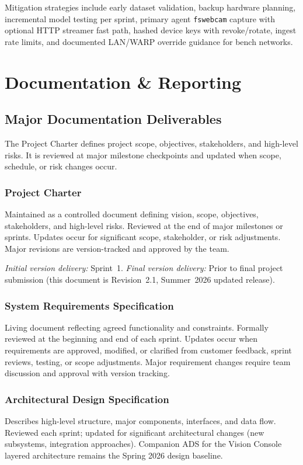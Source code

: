 \documentclass[11pt,letterpaper]{article}
\begin{document}
Mitigation strategies include early dataset validation, backup hardware planning, incremental model
testing per sprint, primary agent \texttt{fswebcam} capture with optional HTTP streamer fast path, hashed device keys with
revoke/rotate, ingest rate limits, and documented LAN/WARP override guidance for bench networks.

\section{Documentation \& Reporting}
\subsection{Major Documentation Deliverables}
The Project Charter defines project scope, objectives, stakeholders, and high-level risks. It is reviewed
at major milestone checkpoints and updated when scope, schedule, or risk changes occur.

\subsubsection{Project Charter}
Maintained as a controlled document defining vision, scope, objectives, stakeholders, and high-level
risks. Reviewed at the end of major milestones or sprints. Updates occur for significant scope,
stakeholder, or risk adjustments. Major revisions are version-tracked and approved by the team.

\textit{Initial version delivery:} Sprint~1.
\textit{Final version delivery:} Prior to final project submission (this document is Revision~2.1,
Summer~2026 updated release).

\subsubsection{System Requirements Specification}
Living document reflecting agreed functionality and constraints. Formally reviewed at the beginning
and end of each sprint. Updates occur when requirements are approved, modified, or clarified from
customer feedback, sprint reviews, testing, or scope adjustments. Major requirement changes require
team discussion and approval with version tracking.

\subsubsection{Architectural Design Specification}
Describes high-level structure, major components, interfaces, and data flow. Reviewed each sprint;
updated for significant architectural changes (new subsystems, integration approaches). Companion
ADS for the Vision Console layered architecture remains the Spring 2026 design baseline.
\end{document}
